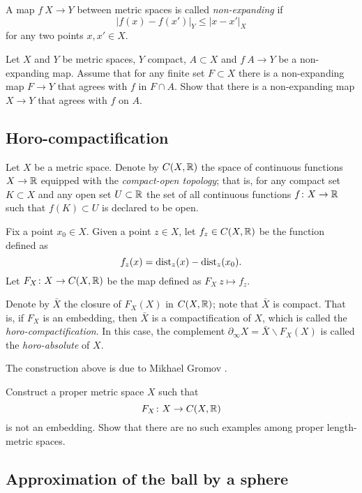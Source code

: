 A map $f\: X\to Y$ between metric spaces is called \emph{non-expanding} if
\[|f(x)-f(x')|_Y\le |x-x'|_X\]
for any two points $x,x'\in X$.

\begin{pr}
Let $X$ and $Y$ be metric spaces, 
$Y$ compact,
$A\subset X$ and $f\:A\to Y$ be a non-expanding map.
Assume that for any finite set $F\subset X$ there is a non-expanding map $F \to Y$
that agrees with $f$ in $F\cap A$.
Show that there is a non-expanding map $X\to  Y$ that agrees with $f$ on $A$.
\end{pr}


\subsection*{Horo-compactification\easy}
\label{Horocompactification}

Let $X$ be a metric space.
Denote by $C(X,\mathbb{R})$ the space of continuous functions $X\to \mathbb{R}$
equipped with the \emph{compact-open topology};
that is, for any compact set $K\subset X$ and any open set $U\subset \mathbb{R}$
the set of all continuous functions $f\colon X\to \mathbb{R}$ such that $f(K)\subset U$
is declared to be open.

Fix a point $x_0\in X$.
Given a point $z\in X$, let $f_z\in C(X,\mathbb{R})$ be the function defined as 
\[f_z(x)=\operatorname{\rm dist}\nolimits_z(x)-\operatorname{\rm dist}\nolimits_z(x_0).\]
Let $F_X\colon X\to C(X,\mathbb{R})$ be the map 
defined as $F_X\:z\mapsto f_z$.

Denote by $\bar X$ 
the closure of $F_X(X)$ in $C(X,\mathbb{R})$;
note that $\bar X$ is compact.
That is, 
if $F_X$ is an embedding, 
then $\bar X$ is a compactification of $X$,
which is called the \emph{horo-compactification}.
In this case, the complement 
$\partial_\infty X=\bar X\backslash F_X(X)$ 
is called the {}\emph{horo-absolute} of $X$.

The construction above is due to Mikhael Gromov \cite[see][]{gromov-hyperbolic}.

\begin{pr}
Construct a proper metric space $X$
such that 
\[F_X\colon X\to C(X,\mathbb{R})\] 
is not an embedding.
Show that there are no such examples among proper length-metric spaces.
\end{pr}

\subsection*{Approximation of the ball by a sphere}
\label{3-sphere is close to a ball}

